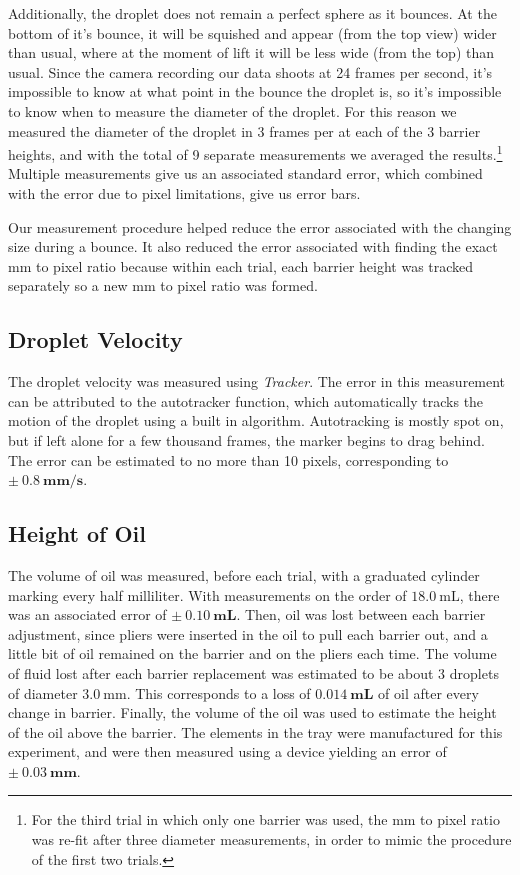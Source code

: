 Additionally, the droplet does not remain a perfect sphere as it bounces. At the bottom of it's bounce, it will be squished and appear (from the top view) wider than usual, where at the moment of lift it will be less wide (from the top) than usual. Since the camera recording our data shoots at 24 frames per second, it's impossible to know at what point in the bounce the droplet is, so it's impossible to know when to measure the diameter of the droplet. For this reason we measured the diameter of the droplet in 3 frames per at each of the 3 barrier heights, and with the total of 9 separate measurements we averaged the results.\footnote{For the third trial in which only one barrier was used, the mm to pixel ratio was re-fit after three diameter measurements, in order to mimic the procedure of the first two trials.} Multiple measurements give us an associated standard error, which combined with the error due to pixel limitations, give us error bars. 

Our measurement procedure helped reduce the error associated with the changing size during a bounce. It also reduced the error associated with finding the exact mm to pixel ratio because within each trial, each barrier height was tracked separately so a new mm to pixel ratio was formed.  

    \subsection{Droplet Velocity}
The droplet velocity was measured using \textit{Tracker}. The error in this measurement can be attributed to the autotracker function, which automatically tracks the motion of the droplet using a built in algorithm. Autotracking is mostly spot on, but if left alone for a few thousand frames, the marker begins to drag behind. The error can be estimated to no more than 10 pixels, corresponding to $\mathbf{\pm~0.8~\mathrm{\textbf{mm/s}}}$.

    \subsection{Height of Oil}
The volume of oil was measured, before each trial, with a graduated cylinder marking every half milliliter. With measurements on the order of $18.0~\mathrm{mL}$, there was an associated error of $\mathbf{\pm~0.10~\mathrm{\textbf{mL}}}$. Then, oil was lost between each barrier adjustment, since pliers were inserted in the oil to pull each barrier out, and a little bit of oil remained on the barrier and on the pliers each time. The volume of fluid lost after each barrier replacement was estimated to be about 3 droplets of diameter $3.0~\mathrm{mm}$. This corresponds to a loss of $\mathbf{0.014~\mathrm{\textbf{mL}}}$ of oil after every change in barrier. 
Finally, the volume of the oil was used to estimate the height of the oil above the barrier. The elements in the tray were manufactured for this experiment, and were then measured using a device yielding an error of $\mathbf{\pm~0.03~\mathrm{\textbf{mm}}}$. 


